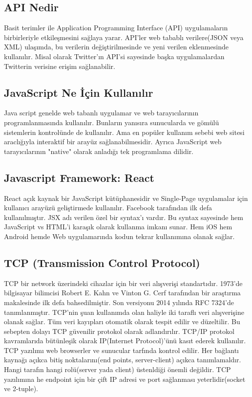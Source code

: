 \subsection{API Nedir}
Basit terimler ile Application Programming Interface (API) uygulamaların birbirleriyle etkileşmesini sağlaya yarar. API'ler web tabablı verilere(JSON veya XML) ulaşımda, bu verilerin değiştirilmesinde ve yeni verilen eklenmesinde kullanılır. Misal olarak Twitter'ın API'si sayesinde başka uygulamalardan Twitterin verisine erişim sağlanabilir.\cite{whatisapi}
\subsection{JavaScript Ne İçin Kullanılır}
Java script genelde web tabanlı uygulamar ve web tarayıcılarının programlanmasında kullanılır. Bunların yanısıra sunucularda ve gömülü sistemlerin kontrolünde de kullanılır. Ama en popüler kullanım sebebi web sitesi araclığıyla interaktif bir arayüz sağlanabilmesidir. Ayrıca JavaScript web tarayıcılarının "native" olarak anladığı tek programlama dilidir.\cite{whyjs}
\subsection{Javascript Framework: React}
React açık kaynak bir JavaScript kütüphanesidir ve Single-Page uygulamalar için kullanıcı arayüzü geliştirmede kullanılır. Facebook tarafından ilk defa kullanılmıştır. JSX adı verilen özel bir syntax'ı vardır. Bu syntax sayesinde hem JavaScript vs HTML'i karaşık olarak kullanma imkanı sunar. Hem iOS hem Android hemde Web uygulamarında kodun tekrar kullanımına olanak sağlar.\cite{react}
\subsection{TCP (Transmission Control Protocol) }
TCP bir network üzerindeki cihazlar için bir veri alışverişi standartıdır. 1973'de bilgisayar bilimcisi Robert E. Kahn ve Vinton G. Cerf tarafından bir araştırma makalesinde ilk defa bahsedilmiştir. Son versiyonu 2014 yılında RFC 7324'de\cite{RFC} tanımlanmıştır. TCP'nin şuan kullanımda olan haliyle iki taraflı veri alışverişine olanak sağlar. Tüm veri kayıpları otomatik olarak tespit edilir ve düzeltilir. Bu sebepten dolayı TCP güvenilir protokol olarak adlandırılır. TCP/IP protokol kavramlarıda bütünleşik olarak IP(Internet Protocol)'ünü kasıt ederek kullanılır. 
\newline
\newline
TCP yazılımı web browserler ve sunucular tarfında kontrol edilir. Her bağlantı kaynağı açıkca bitiş noktalarını(end points, server-client) açıkca tanımlamaldır. Hangi tarafın hangi rolü(server yada client) üstenldiği önemli değildir. TCP yazılımına he endpoint için bir çift IP adresi ve port sağlanması yeterlidir(socket ve 2-tuple).




